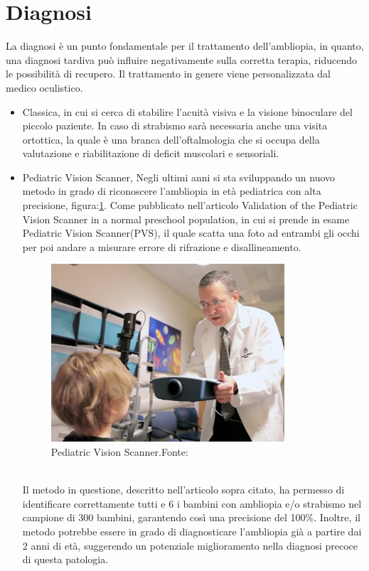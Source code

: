 \documentclass[
a4paper,
cleardoublepage=empty,
headings=twolinechapter,
numbers=autoenddot,
]{scrbook}
\begin{document}
	\section{Diagnosi}
	La diagnosi è un punto fondamentale per il trattamento dell'ambliopia, in quanto, una diagnosi tardiva può influire negativamente sulla corretta terapia, riducendo le possibilità di recupero.
	Il trattamento in genere viene personalizzata dal medico oculistico.
	\begin{itemize}
		\item Classica, in cui si cerca di stabilire l'acuità visiva e la visione binoculare del piccolo paziente. In caso di strabismo sarà necessaria anche una visita ortottica, la quale è una branca dell'oftalmologia che si occupa della valutazione e riabilitazione di deficit muscolari e sensoriali.
		\item Pediatric Vision Scanner, Negli ultimi anni si sta sviluppando un nuovo metodo in grado di riconoscere l'ambliopia in età pediatrica con alta precisione, figura:\ref{fig:pvs}.
		Come pubblicato nell'articolo Validation of the Pediatric Vision Scanner in a normal preschool population\cite{pvs}, in cui si prende in esame Pediatric Vision Scanner(PVS), il quale scatta una foto ad entrambi gli occhi per poi andare a misurare errore di rifrazione e disallineamento.
		\begin{figure}[h]
			\centering
			\includegraphics[width=0.7\linewidth]{image/pvs}
			\caption{Pediatric Vision Scanner.Fonte:\cite{PVS_image}}
			\label{fig:pvs}
		\end{figure}\\
		Il metodo in questione, descritto nell'articolo sopra citato, ha permesso di identificare correttamente tutti e 6 i bambini con ambliopia e/o strabismo nel campione di 300 bambini, garantendo così una precisione del 100\%. Inoltre, il metodo potrebbe essere in grado di diagnosticare l'ambliopia già a partire dai 2 anni di età, suggerendo un potenziale miglioramento nella diagnosi precoce di questa patologia.
		
	\end{itemize}
	
\end{document}
